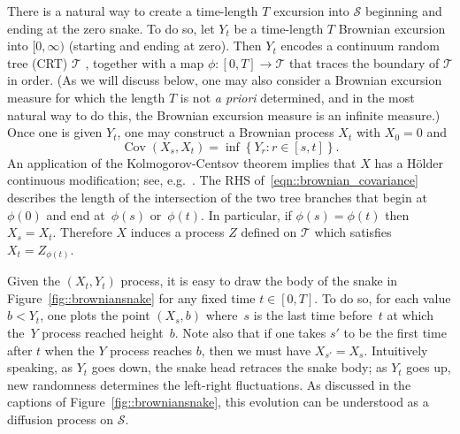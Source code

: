 \documentclass[10pt]{amsart}
\let\mathcal\mathscr
\let\oldS\S
\theoremstyle{plain}
\numberwithin{theorem}{section}
\theoremstyle{definition}
\newcommand{\CT}{{\mathcal T}}\let\treespace\CT
\newcommand{\snake}{{\mathcal S}}
\renewcommand{\S}{{\mathbf S}}
\DeclareMathOperator{\Cov}{Cov}
\begin{document}
There is a natural way to create a time-length $T$ excursion into $\snake$ beginning and ending at the zero snake. To do so, let $Y_t$ be a time-length $T$ Brownian excursion into $[0, \infty)$ (starting and ending at zero). Then $Y_t$ encodes a continuum random tree (CRT) $\mathcal T$ \cite{ald1991crt1,ald1991crt2,ald1993crt3}, together with a map $\phi\colon [0,T] \to \mathcal T$ that traces the boundary of $\CT$ in order. (As we will discuss below, one may also consider a Brownian excursion measure for which the length $T$ is not \emph{a priori} determined, and in the most natural way to do this, the Brownian excursion measure is an infinite measure.) Once one is given $Y_t$, one may construct a Brownian process $X_t$ with $X_0 = 0$ and
\begin{equation}
\label{eqn::brownian_covariance}
\Cov(X_s, X_t) = \inf \left\{Y_r: r \in [s,t] \right\}.
\end{equation}
An application of the Kolmogorov-Centsov theorem implies that $X$ has a Hölder continuous modification; see, e.g.\ \cite[\oldS 3.4]{legall2014icm}. The RHS of~\eqref{eqn::brownian_covariance} describes the length of the intersection of the two tree branches that begin at~$\phi(0)$ and end at~$\phi(s)$ or~$\phi(t)$. In particular, if $\phi(s) = \phi(t)$ then $X_s = X_t$. Therefore $X$ induces a process $Z$ defined on $\CT$ which satisfies $X_t = Z_{\phi(t)}$.

Given the $(X_t, Y_t)$ process, it is easy to draw the body of the snake in Figure~\ref{fig::browniansnake} for any fixed time $t \in [0,T]$. To do so, for each value $b < Y_t$, one plots the point $(X_s, b)$ where~$s$ is the last time before~$t$ at which the~$Y$ process reached height~$b$. Note also that if one takes $s'$ to be the first time after $t$ when the $Y$ process reaches $b$, then we must have $X_{s'} = X_s$. Intuitively speaking, as $Y_t$ goes down, the snake head retraces the snake body; as $Y_t$ goes up, new randomness determines the left-right fluctuations. As discussed in the captions of Figure~\ref{fig::browniansnake}, this evolution can be understood as a diffusion process on $\snake$.
\end{document}
